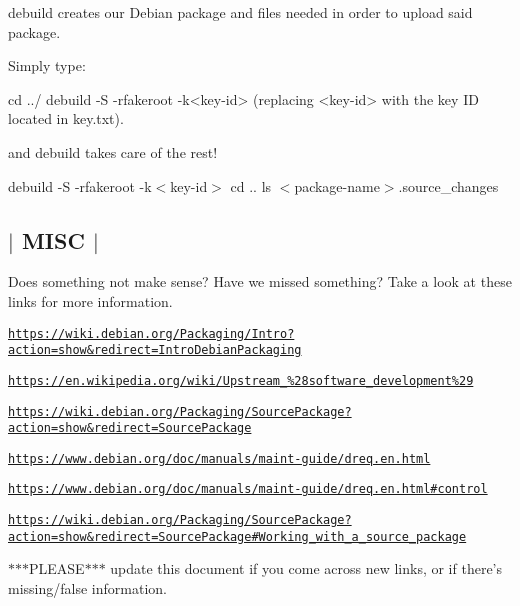 debuild creates our Debian package and files needed in order to upload said package.

Simply type\-: \begin{DoxyVerb}cd ../
debuild -S -rfakeroot -k<key-id> (replacing <key-id> with the key ID located in key.txt). 
\end{DoxyVerb}


and debuild takes care of the rest!

debuild -\/\-S -\/rfakeroot -\/k$<$key-\/id$>$ cd .. ls $<$package-\/name$>$.source\-\_\-changes 

 \subsection*{$\vert$ M\-I\-S\-C $\vert$ }

Does something not make sense? Have we missed something? Take a look at these links for more information.

\href{https://wiki.debian.org/Packaging/Intro?action=show&redirect=IntroDebianPackaging}{\tt https\-://wiki.\-debian.\-org/\-Packaging/\-Intro?action=show\&redirect=\-Intro\-Debian\-Packaging}

\href{https://en.wikipedia.org/wiki/Upstream_%28software_development%29}{\tt https\-://en.\-wikipedia.\-org/wiki/\-Upstream\-\_\-\%28software\-\_\-development\%29}

\href{https://wiki.debian.org/Packaging/SourcePackage?action=show&redirect=SourcePackage}{\tt https\-://wiki.\-debian.\-org/\-Packaging/\-Source\-Package?action=show\&redirect=\-Source\-Package}

\href{https://www.debian.org/doc/manuals/maint-guide/dreq.en.html}{\tt https\-://www.\-debian.\-org/doc/manuals/maint-\/guide/dreq.\-en.\-html}

\href{https://www.debian.org/doc/manuals/maint-guide/dreq.en.html#control}{\tt https\-://www.\-debian.\-org/doc/manuals/maint-\/guide/dreq.\-en.\-html\#control}

\href{https://wiki.debian.org/Packaging/SourcePackage?action=show&redirect=SourcePackage#Working_with_a_source_package}{\tt https\-://wiki.\-debian.\-org/\-Packaging/\-Source\-Package?action=show\&redirect=\-Source\-Package\#\-Working\-\_\-with\-\_\-a\-\_\-source\-\_\-package}

$\ast$$\ast$$\ast$\-P\-L\-E\-A\-S\-E$\ast$$\ast$$\ast$ update this document if you come across new links, or if there's missing/false information. 